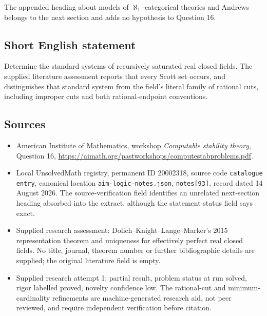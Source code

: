 \documentclass[11pt]{article}
\begin{document}
The appended heading about models of $\aleph_1$-categorical theories and Andrews belongs to the next section and adds no hypothesis to Question 16.
\subsection{Short English statement}
Determine the standard systems of recursively saturated real closed fields. The supplied literature assessment reports that every Scott set occurs, and distinguishes that standard system from the field's literal family of rational cuts, including improper cuts and both rational-endpoint conventions.
\subsection{Sources}
\begin{itemize}
\item American Institute of Mathematics, workshop \emph{Computable stability theory}, Question 16, \url{https://aimath.org/pastworkshops/computestabproblems.pdf}.
\item Local UnsolvedMath registry, permanent ID 20002318, source code \texttt{catalogue entry}, canonical location \texttt{aim-logic-notes.json}, \texttt{notes[93]}, record dated 14 August 2026. The source-verification field identifies an unrelated next-section heading absorbed into the extract, although the statement-status field says exact.
\item Supplied research assessment: Dolich--Knight--Lange--Marker's 2015 representation theorem and uniqueness for effectively perfect real closed fields. No title, journal, theorem number or further bibliographic details are supplied; the original literature field is empty.
\item Supplied research attempt 1: partial result, problem status at run solved, rigor labelled proved, novelty confidence low. The rational-cut and minimum-cardinality refinements are machine-generated research aid, not peer reviewed, and require independent verification before citation.
\end{itemize}
\end{document}
